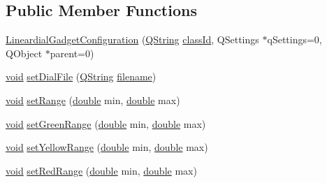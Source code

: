 \subsection*{Public Member Functions}
\begin{DoxyCompactItemize}
\item 
\hyperlink{group___linear_dial_plugin_ga49b8e3de979573e8574a47a355fb537f}{Lineardial\-Gadget\-Configuration} (\hyperlink{group___u_a_v_objects_plugin_gab9d252f49c333c94a72f97ce3105a32d}{Q\-String} \hyperlink{group___core_plugin_gac953657221ba7fda967ada0408332641}{class\-Id}, Q\-Settings $\ast$q\-Settings=0, Q\-Object $\ast$parent=0)
\item 
\hyperlink{group___u_a_v_objects_plugin_ga444cf2ff3f0ecbe028adce838d373f5c}{void} \hyperlink{group___linear_dial_plugin_ga20902ca5cb846c1c93ac9d0ef3799eca}{set\-Dial\-File} (\hyperlink{group___u_a_v_objects_plugin_gab9d252f49c333c94a72f97ce3105a32d}{Q\-String} \hyperlink{ioapi_8h_a7a03a664b090ce5c848ecb31cb4a2fa8}{filename})
\item 
\hyperlink{group___u_a_v_objects_plugin_ga444cf2ff3f0ecbe028adce838d373f5c}{void} \hyperlink{group___linear_dial_plugin_gaa4baee59ed6a862a9c31f64b2349acdc}{set\-Range} (\hyperlink{_super_l_u_support_8h_a8956b2b9f49bf918deed98379d159ca7}{double} min, \hyperlink{_super_l_u_support_8h_a8956b2b9f49bf918deed98379d159ca7}{double} max)
\item 
\hyperlink{group___u_a_v_objects_plugin_ga444cf2ff3f0ecbe028adce838d373f5c}{void} \hyperlink{group___linear_dial_plugin_ga126eafb9e37022d0160d544665e9687d}{set\-Green\-Range} (\hyperlink{_super_l_u_support_8h_a8956b2b9f49bf918deed98379d159ca7}{double} min, \hyperlink{_super_l_u_support_8h_a8956b2b9f49bf918deed98379d159ca7}{double} max)
\item 
\hyperlink{group___u_a_v_objects_plugin_ga444cf2ff3f0ecbe028adce838d373f5c}{void} \hyperlink{group___linear_dial_plugin_gae1437ef9469c5a813ad0c76f04b186d2}{set\-Yellow\-Range} (\hyperlink{_super_l_u_support_8h_a8956b2b9f49bf918deed98379d159ca7}{double} min, \hyperlink{_super_l_u_support_8h_a8956b2b9f49bf918deed98379d159ca7}{double} max)
\item 
\hyperlink{group___u_a_v_objects_plugin_ga444cf2ff3f0ecbe028adce838d373f5c}{void} \hyperlink{group___linear_dial_plugin_gab1a3bcf875948fdb2203a511b7245e36}{set\-Red\-Range} (\hyperlink{_super_l_u_support_8h_a8956b2b9f49bf918deed98379d159ca7}{double} min, \hyperlink{_super_l_u_support_8h_a8956b2b9f49bf918deed98379d159ca7}{double} max)
\item 

\end{DoxyCompactItemize}
